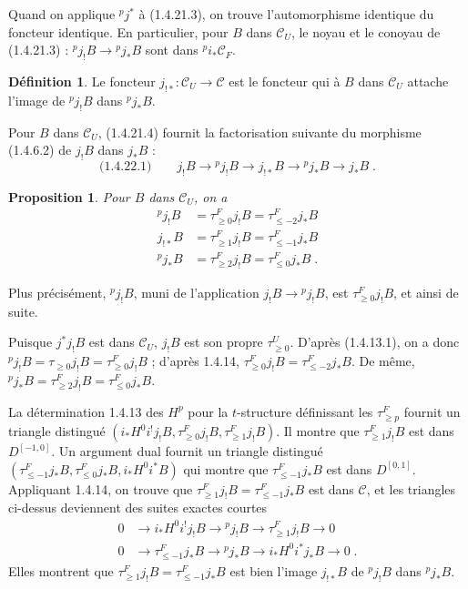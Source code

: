 \documentclass[12pt,a4paper]{article}
\theoremstyle{plain}
\newtheorem{proposition}[theorem]{Proposition}
\theoremstyle{definition}
\newtheorem{definition}[theorem]{D\'efinition}
\begin{document}
Quand on applique ${}^p j^*$ \`a (1.4.21.3), on trouve l'automorphisme identique du foncteur identique. En particulier, pour $B$ dans $\mathcal{C}_U$, le noyau et le conoyau de (1.4.21.3) : ${}^p j_! B \to {}^p j_* B$ sont dans ${}^p i_* \mathcal{C}_F$.

\begin{definition}\label{def:1.4.22}
Le foncteur $j_{!*} : \mathcal{C}_U \to \mathcal{C}$ est le foncteur qui \`a $B$ dans $\mathcal{C}_U$ attache l'image de ${}^p j_! B$ dans ${}^p j_* B$.
\end{definition}

Pour $B$ dans $\mathcal{C}_U$, (1.4.21.4) fournit la factorisation suivante du morphisme (1.4.6.2) de $j_! B$ dans $j_* B$ :
\[
\text{(1.4.22.1)}\qquad j_! B \longrightarrow {}^p j_! B \longrightarrow j_{!*} B \longrightarrow {}^p j_* B \longrightarrow j_* B\;.
\]

\begin{proposition}\label{prop:1.4.23}
Pour $B$ dans $\mathcal{C}_U$, on a
\begin{align*}
{}^p j_! B &= \tau_{\geqslant 0}^F j_! B = \tau_{\leqslant -2}^F j_* B\\
j_{!*} B &= \tau_{\geqslant 1}^F j_! B = \tau_{\leqslant -1}^F j_* B\\
{}^p j_* B &= \tau_{\geqslant 2}^F j_! B = \tau_{\leqslant 0}^F j_* B\;.
\end{align*}
\end{proposition}

Plus pr\'ecis\'ement, ${}^p j_! B$, muni de l'application $j_! B \to {}^p j_! B$, est $\tau_{\geqslant 0}^F j_! B$, et ainsi de suite.

Puisque $j^* j_! B$ est dans $\mathcal{C}_U$, $j_! B$ est son propre $\tau_{\geqslant 0}^U$. D'apr\`es (1.4.13.1), on a donc ${}^p j_! B = \tau_{\geqslant 0} j_! B = \tau_{\geqslant 0}^F j_! B$ ; d'apr\`es 1.4.14, $\tau_{\geqslant 0}^F j_! B = \tau_{\leqslant -2}^F j_* B$. De m\^eme, ${}^p j_* B = \tau_{\geqslant 2}^F j_! B = \tau_{\leqslant 0}^F j_* B$.

La d\'etermination 1.4.13 des $H^p$ pour la $t$-structure d\'efinissant les $\tau_{\geqslant p}^F$ fournit un triangle distingu\'e $(i_* H^0 i^! j_! B, \tau_{\geqslant 0}^F j_! B, \tau_{\geqslant 1}^F j_! B)$. Il montre que $\tau_{\geqslant 1}^F j_! B$ est dans $D^{[-1,0]}$. Un argument dual fournit un triangle distingu\'e $(\tau_{\leqslant -1}^F j_* B, \tau_{\leqslant 0}^F j_* B, i_* H^0 i^* B)$ qui montre que $\tau_{\leqslant -1}^F j_* B$ est dans $D^{[0,1]}$. Appliquant 1.4.14, on trouve que $\tau_{\geqslant 1}^F j_! B = \tau_{\leqslant -1}^F j_* B$ est dans $\mathcal{C}$, et les triangles ci-dessus deviennent des suites exactes courtes
\begin{align*}
0 &\longrightarrow i_* H^0 i^! j_! B \longrightarrow {}^p j_! B \longrightarrow \tau_{\geqslant 1}^F j_! B \longrightarrow 0\\
0 &\longrightarrow \tau_{\leqslant -1}^F j_* B \longrightarrow {}^p j_* B \longrightarrow i_* H^0 i^* j_* B \longrightarrow 0\;.
\end{align*}
Elles montrent que $\tau_{\geqslant 1}^F j_! B = \tau_{\leqslant -1}^F j_* B$ est bien l'image $j_{!*} B$ de ${}^p j_! B$ dans ${}^p j_* B$.
\end{document}

